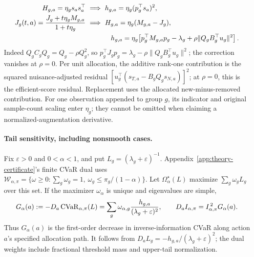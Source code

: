 \begin{equation}
\begin{aligned}
H_{g,a}=\eta_gs_as_a^\top
&\ \Longrightarrow\ h_{g,a}=\eta_g(p_g^\top s_a)^2,\\
J_g(t,a)=\frac{J_g+t\eta_gM_{g,a}}{1+t\eta_g}
&\ \Longrightarrow\ H_{g,a}=\eta_g(M_{g,a}-J_g),\\
&\hspace{13mm}h_{g,a}=\eta_g\!\left[p_g^\top M_{g,a}p_g-\lambda_g
+\rho\lVert Q_gB_g^\top u_g\rVert^2\right].
\end{aligned}
\label{eq:influence-ridge-normalized-gain}
\end{equation}
Indeed $Q_gC_gQ_g=Q_g-\rho Q_g^2$, so $p_g^\top J_gp_g=\lambda_g-\rho\lVert Q_gB_g^\top u_g\rVert^2$; the correction vanishes at $\rho=0$. Per unit allocation, the additive rank-one contribution is the squared nuisance-adjusted residual $[u_g^\top(s_{T,a}-B_gQ_gs_{N,a})]^2$; at $\rho=0$, this is the efficient-score residual. Replacement uses the allocated new-minus-removed contribution. For one observation appended to group $g$, its indicator and original sample-count scaling enter $\eta_g$; they cannot be omitted when claiming a normalized-augmentation derivative.

\paragraph{Tail sensitivity, including nonsmooth cases.}
Fix $\varepsilon>0$ and $0<\alpha<1$, and put $L_g=(\lambda_g+\varepsilon)^{-1}$. Appendix~\ref{app:theory-certificate}'s finite CVaR dual uses
$\mathcal W_{\alpha,\pi}=\{\omega\ge0:\sum_g\omega_g=1,\ \omega_g\le\pi_g/(1-\alpha)\}$.
Let $\Omega_\alpha^\star(L)$ maximize $\sum_g\omega_gL_g$ over this set. If the maximizer $\omega_\alpha$ is unique and eigenvalues are simple,
\begin{equation}
G_\alpha(a):=-D_a\operatorname{CVaR}_{\alpha,\pi}(L)
=\sum_g\omega_{\alpha,g}\frac{h_{g,a}}{(\lambda_g+\varepsilon)^2},
\qquad D_a I_{\alpha,\pi}=I_{\alpha,\pi}^{\,2}G_\alpha(a).
\label{eq:tail-information-gain}
\end{equation}
Thus $G_\alpha(a)$ is the first-order decrease in inverse-information CVaR along action $a$'s specified allocation path. It follows from $D_aL_g=-h_{g,a}/(\lambda_g+\varepsilon)^2$; the dual weights include fractional threshold mass and upper-tail normalization.

